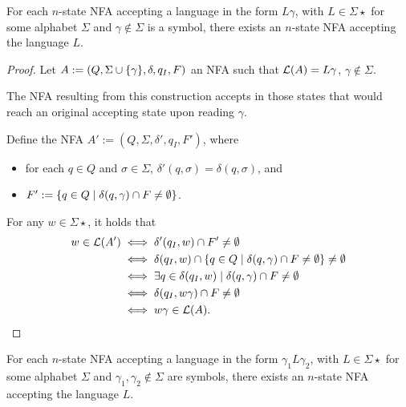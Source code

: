 \begin{thrm}
	For each $n$-state NFA accepting a language in the form $L\gamma$, with $L\in\Sigma\star$ for some alphabet $\Sigma$ and $\gamma\notin\Sigma$ is a symbol, there exists an $n$-state NFA accepting the language $L$.
\end{thrm}
\begin{proof}
	Let $A:=(Q,\Sigma\cup\{\gamma\},\delta,q_I,F)$ an NFA such that $\mathcal L(A)=L\gamma$, $\gamma\notin\Sigma$.

	The NFA resulting from this construction accepts in those states that would reach an original accepting state upon reading $\gamma$.

	Define the NFA $A':=(Q,\Sigma,\delta',q_I,F')$, where
	\begin{itemize}
		\item for each $q\in Q$ and $\sigma\in\Sigma$, $\delta'(q,\sigma)=\delta(q,\sigma)$, and
		\item $F':=\{q\in Q\mid \delta(q,\gamma)\cap F\ne\emptyset\}$.
	\end{itemize}

	For any $w\in\Sigma\star$, it holds that
	\begin{align*}
		w\in\mathcal L(A') & \iff \delta'(q_I,w)\cap F'\ne\emptyset                                                 \\
		                 & \iff \delta(q_I,w)\cap \{q\in Q\mid \delta(q,\gamma)\cap F\ne\emptyset\}\ne\emptyset \\
		                 & \iff \exists q\in\delta(q_I,w)\mid \delta(q,\gamma)\cap F\ne\emptyset                  \\
		                 & \iff \delta(q_I,w\gamma)\cap F\ne\emptyset                                             \\
		                 & \iff w\gamma\in\mathcal L(A) \text. \qedhere
	\end{align*}
\end{proof}


\begin{coro}
	For each $n$-state NFA accepting a language in the form $\gamma_1 L\gamma_2$, with $L\in\Sigma\star$ for some alphabet $\Sigma$ and $\gamma_1,\gamma_2\notin\Sigma$ are symbols, there exists an $n$-state NFA accepting the language $L$.
\end{coro}
